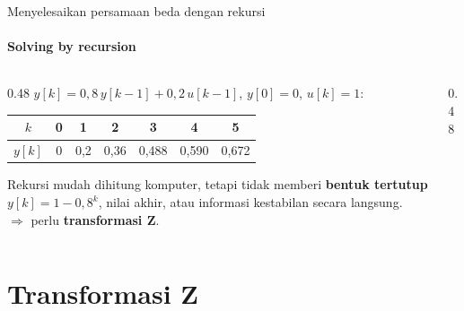 \documentclass[aspectratio=169,10pt]{beamer}
\begin{document}
\begin{frame}{Menyelesaikan persamaan beda dengan rekursi}
	\framesubtitle{Solving by recursion}
	\begin{columns}[c]
		\begin{column}{0.48\textwidth}
			\small
			$y[k] = 0{,}8\,y[k-1] + 0{,}2\,u[k-1]$, $y[0]=0$, $u[k]=1$:
			\renewcommand{\arraystretch}{1.15}
			\begin{tabular}{@{}c c c c c c c@{}}
				\toprule
				$k$ & 0 & 1 & 2 & 3 & 4 & 5 \\
				\midrule
				$y[k]$ & 0 & 0,2 & 0,36 & 0,488 & 0,590 & 0,672 \\
				\bottomrule
			\end{tabular}

			\vspace{0.2cm}
			Rekursi mudah dihitung komputer, tetapi tidak memberi \textbf{bentuk tertutup} $y[k]=1-0{,}8^k$, nilai akhir, atau informasi kestabilan secara langsung.\\[3pt]
			$\Rightarrow$ perlu \textbf{transformasi Z}.
		\end{column}
		\begin{column}{0.48\textwidth}
			\centering
		\end{column}
	\end{columns}
\end{frame}

\section{Transformasi Z\texorpdfstring{\\[4pt]{\Large{}}}{ / The Z-Transform}}
\end{document}
